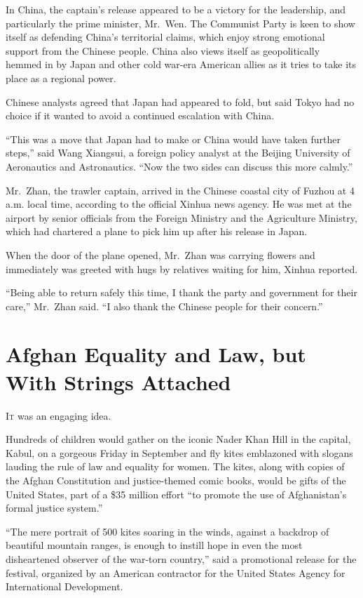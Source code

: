 ﻿\documentclass[12pt]{article}
\begin{document}
In China, the captain's release appeared to be a victory for the leadership, and particularly the
prime minister, Mr.~Wen. The Communist Party is keen to show itself as defending China's territorial
claims, which enjoy strong emotional support from the Chinese people. China also views itself as
geopolitically hemmed in by Japan and other cold war-era American allies as it tries to take its
place as a regional power.

Chinese analysts agreed that Japan had appeared to fold, but said Tokyo had no choice if it wanted
to avoid a continued escalation with China.

``This was a move that Japan had to make or China would have taken further steps,'' said Wang
Xiangsui, a foreign policy analyst at the Beijing University of Aeronautics and Astronautics. ``Now
the two sides can discuss this more calmly.''

Mr.~Zhan, the trawler captain, arrived in the Chinese coastal city of Fuzhou at 4 a.m. local time,
according to the official Xinhua news agency. He was met at the airport by senior officials from the
Foreign Ministry and the Agriculture Ministry, which had chartered a plane to pick him up after his
release in Japan.

When the door of the plane opened, Mr.~Zhan was carrying flowers and immediately was greeted with
hugs by relatives waiting for him, Xinhua reported.

``Being able to return safely this time, I thank the party and government for their care,'' Mr.~Zhan
said. ``I also thank the Chinese people for their concern.''

\pagebreak
\section{Afghan Equality and Law, but With Strings Attached}

\lettrine{I}{t} was an engaging idea.

Hundreds of children would gather on the iconic Nader Khan Hill in the capital, Kabul, on a gorgeous
Friday in September and fly kites emblazoned with slogans lauding the rule of law and equality for
women. The kites, along with copies of the Afghan Constitution and justice-themed comic books, would
be gifts of the United States, part of a \$35 million effort ``to promote the use of Afghanistan's
formal justice system.''

``The mere portrait of 500 kites soaring in the winds, against a backdrop of beautiful mountain
ranges, is enough to instill hope in even the most disheartened observer of the war-torn country,''
said a promotional release for the festival, organized by an American contractor for the United
States Agency for International Development.
\end{document}
